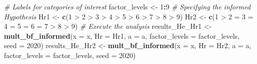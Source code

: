 \documentclass[
  english,
  man,floatsintext]{apa6}
\newenvironment{Shaded}{\begin{snugshade}}{\end{snugshade}}
\newcommand{\CommentTok}[1]{\textcolor[rgb]{0.56,0.35,0.01}{\textit{#1}}}
\newcommand{\DataTypeTok}[1]{\textcolor[rgb]{0.13,0.29,0.53}{#1}}
\newcommand{\DecValTok}[1]{\textcolor[rgb]{0.00,0.00,0.81}{#1}}
\newcommand{\KeywordTok}[1]{\textcolor[rgb]{0.13,0.29,0.53}{\textbf{#1}}}
\newcommand{\NormalTok}[1]{#1}
\newcommand{\OperatorTok}[1]{\textcolor[rgb]{0.81,0.36,0.00}{\textbf{#1}}}
\newcommand{\StringTok}[1]{\textcolor[rgb]{0.31,0.60,0.02}{#1}}
\begin{document}
\begin{Shaded}
\begin{Highlighting}[]
\CommentTok{\# Labels for categories of interest}
\NormalTok{factor\_levels \textless{}{-}}\StringTok{ }\DecValTok{1}\OperatorTok{:}\DecValTok{9}
\CommentTok{\# Specifying the informed Hypothesis}
\NormalTok{Hr1 \textless{}{-}}\StringTok{ }\KeywordTok{c}\NormalTok{(}\StringTok{\textquotesingle{}1 \textgreater{} 2 \textgreater{} 3 \textgreater{} 4 \textgreater{} 5 \textgreater{} 6 \textgreater{} 7 \textgreater{} 8 \textgreater{} 9\textquotesingle{}}\NormalTok{)}
\NormalTok{Hr2 \textless{}{-}}\StringTok{ }\KeywordTok{c}\NormalTok{(}\StringTok{\textquotesingle{}1 \textgreater{} 2 = 3 = 4 = 5 = 6 = 7 \textgreater{} 8 \textgreater{} 9\textquotesingle{}}\NormalTok{)}
\CommentTok{\# Execute the analysis}
\NormalTok{results\_He\_Hr1 \textless{}{-}}\StringTok{ }\KeywordTok{mult\_bf\_informed}\NormalTok{(}\DataTypeTok{x =}\NormalTok{ x, }\DataTypeTok{Hr =}\NormalTok{ Hr1, }\DataTypeTok{a =}\NormalTok{ a, }
                                 \DataTypeTok{factor\_levels =}\NormalTok{ factor\_levels, }
                                 \DataTypeTok{seed =} \DecValTok{2020}\NormalTok{)}
\NormalTok{results\_He\_Hr2 \textless{}{-}}\StringTok{ }\KeywordTok{mult\_bf\_informed}\NormalTok{(}\DataTypeTok{x =}\NormalTok{ x, }\DataTypeTok{Hr =}\NormalTok{ Hr2, }\DataTypeTok{a =}\NormalTok{ a, }
                                 \DataTypeTok{factor\_levels =}\NormalTok{ factor\_levels, }
                                 \DataTypeTok{seed =} \DecValTok{2020}\NormalTok{)}
\end{Highlighting}
\end{Shaded}

\begin{Shaded}
\end{Shaded}
\end{document}
